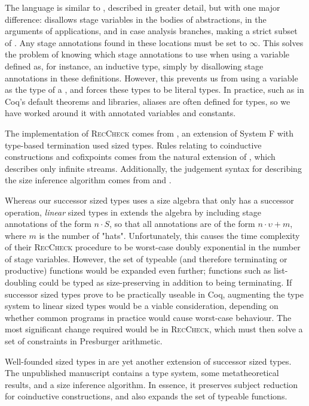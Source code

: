 \documentclass[sigplan,10pt,anonymous,review]{acmart}
\begin{document}
The language \CIChatbar \cite{cic-hat-bar} is similar to \CIChat, described in greater detail, but with one major difference: \CIChatbar disallows stage variables in the bodies of abstractions, in the arguments of applications, and in case analysis branches, making \CIChatbar a strict subset of \CIChat. Any stage annotations found in these locations must be set to $\infty$. This solves the problem of knowing which stage annotations to use when using a variable defined as, for instance, an inductive type, simply by disallowing stage annotations in these definitions. However, this prevents us from using a variable as the \corecursive type of a \cofixpoint, and forces these types to be literal \coinductive types. In practice, such as in Coq's default theorems and libraries, aliases are often defined for \coinductive types, so we have worked around it with annotated variables and constants.

The implementation of \textsc{RecCheck} comes from \Fhat \cite{f-hat}, an extension of System F with type-based termination used sized types. Rules relating to coinductive constructions and cofixpoints comes from the natural extension of \CChatomega \cite{cc-hat-omega}, which describes only infinite streams. Additionally, the judgement syntax for describing the size inference algorithm comes from \CChatomega and \CIChatl \cite{cic-hat-l}.

Whereas our successor sized types uses a size algebra that only has a successor operation, \textit{linear} sized types in \CIChatl extends the algebra by including stage annotations of the form $n \cdot S$, so that all annotations are of the form $n \cdot \upsilon + m$, where $m$ is the number of "hats". Unfortunately, this causes the time complexity of their \textsc{RecCheck} procedure to be worst-case doubly exponential in the number of stage variables. However, the set of typeable (and therefore terminating or productive) functions would be expanded even further; functions such as list-doubling could be typed as size-preserving in addition to being terminating. If successor sized types prove to be practically useable in Coq, augmenting the type system to linear sized types would be a viable consideration, depending on whether common programs in practice would cause worst-case behaviour. The most significant change required would be in \textsc{RecCheck}, which must then solve a set of constraints in Presburger arithmetic.

Well-founded sized types in \CIChatsub \cite{wellfounded} are yet another extension of successor sized types. The unpublished manuscript contains a type system, some metatheoretical results, and a size inference algorithm. In essence, it preserves subject reduction for coinductive constructions, and also expands the set of typeable functions.
\end{document}
